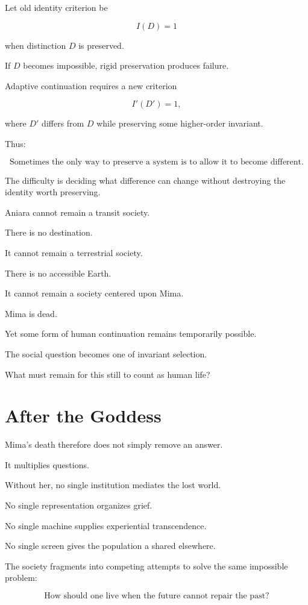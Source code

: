 \documentclass[11pt,oneside]{book}
\theoremstyle{definition}
\theoremstyle{remark}
\begin{document}
Let old identity criterion be

\[
I(D)=1
\]

when distinction \(D\) is preserved.

If \(D\) becomes impossible, rigid preservation produces failure.

Adaptive continuation requires a new criterion

\[
I'(D')=1,
\]

where \(D'\) differs from \(D\) while preserving some higher-order invariant.

Thus:

\[
\boxed{
\text{Sometimes the only way to preserve a system is to allow it to become different.}
}
\]

The difficulty is deciding what difference can change without destroying the identity worth preserving.

Aniara cannot remain a transit society.

There is no destination.

It cannot remain a terrestrial society.

There is no accessible Earth.

It cannot remain a society centered upon Mima.

Mima is dead.

Yet some form of human continuation remains temporarily possible.

The social question becomes one of invariant selection.

What must remain for this still to count as human life?

\section{After the Goddess}

Mima's death therefore does not simply remove an answer.

It multiplies questions.

Without her, no single institution mediates the lost world.

No single representation organizes grief.

No single machine supplies experiential transcendence.

No single screen gives the population a shared elsewhere.

The society fragments into competing attempts to solve the same impossible problem:

\[
\text{How should one live when the future cannot repair the past?}
\]
\end{document}
